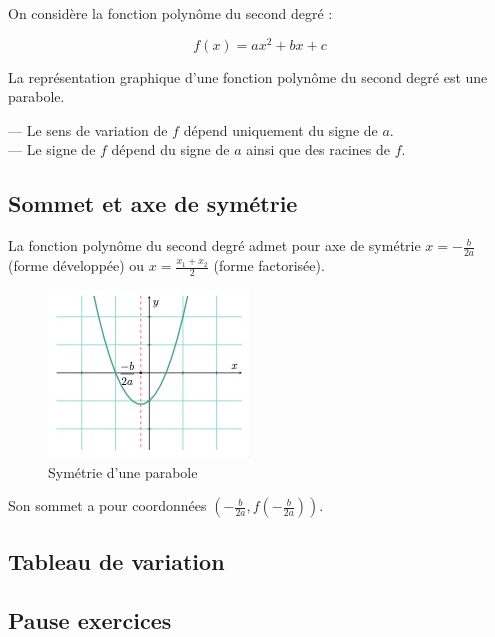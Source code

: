 \documentclass[a4paper,12pt]{article}
\begin{document}
On considère la fonction polynôme du second degré :

\[
f(x) = ax^2 + bx + c
\]

La représentation graphique d'une fonction polynôme du second degré est une parabole.

— Le sens de variation de $f$ dépend uniquement du signe de $a$. \\
— Le signe de $f$ dépend du signe de $a$ ainsi que des racines de $f$.

\subsection*{Sommet et axe de symétrie}

La fonction polynôme du second degré admet pour axe de symétrie $x = -\frac{b}{2a}$ (forme développée) ou $x = \frac{x_1 + x_2}{2}$ (forme factorisée).

\begin{figure}[H]
  \centering
  \includegraphics[width=0.3\linewidth]{symetrie.jpg}
  \caption{\label{} Symétrie d'une parabole}
\end{figure}

Son sommet a pour coordonnées $\left(-\frac{b}{2a}, f\left(-\frac{b}{2a}\right)\right)$.

\subsection*{Tableau de variation}


\subsection*{Pause exercices}
\end{document}

